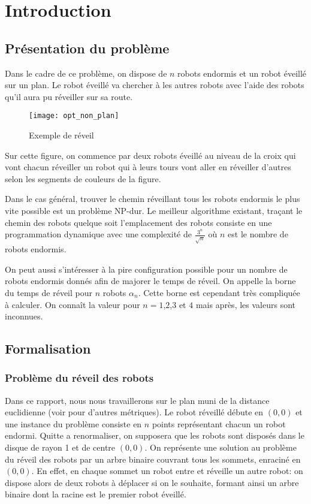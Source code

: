 \section{Introduction}

\subsection{Présentation du problème}

Dans le cadre de ce problème, on dispose de $n$ robots endormis et un robot éveillé sur un plan. Le robot éveillé va chercher à les autres robots avec l'aide des robots qu'il aura pu réveiller sur sa route.

\begin{figure}[h!]
  \centering
  \texttt{[image: opt\_non\_plan]}
  \caption{Exemple de réveil}
  \label{fig:opt_non_plan}
\end{figure}

Sur cette figure, on commence par deux robots éveillé au niveau de la croix qui vont chacun réveiller un robot qui à leurs tours vont aller en réveiller d'autres selon les segments de couleurs de la figure.

Dans le cas général, trouver le chemin réveillant tous les robots endormis le plus vite possible est un problème NP-dur. Le meilleur algorithme existant, traçant le chemin des robots quelque soit l'emplacement des robots consiste en une programmation dynamique avec une complexité de $\frac{3^n}{\sqrt{n}}$ où $n$ est le nombre de robots endormis.

On peut aussi s'intéresser à la pire configuration possible pour un nombre de robots endormis donnés afin de majorer le temps de réveil. On appelle la borne du temps de réveil pour $n$ robots $\alpha_n$. Cette borne est cependant très compliquée à calculer. On connaît la valeur pour $n = 1$,$2$,$3$ et $4$ mais après, les valeurs sont inconnues.
\subsection{Formalisation}

\subsubsection{Problème du réveil des robots}

Dans ce rapport, nous nous travaillerons sur le plan muni de la distance
euclidienne (voir \cite{} pour d'autres métriques). Le robot réveillé débute en
$(0,0)$ et une instance du problème consiste en $n$ points représentant chacun
un robot endormi. Quitte a renormaliser, on supposera que les robots sont
disposés dans le disque de rayon 1 et de centre $(0,0)$. On représente une
solution au problème du réveil des robots par un arbre binaire couvrant tous les
sommets, enraciné en $(0, 0)$. En effet, en chaque sommet un robot entre et
réveille un autre robot: on dispose alors de deux robots à déplacer si on le
souhaite, formant ainsi un arbre binaire dont la racine est le premier robot
éveillé.

